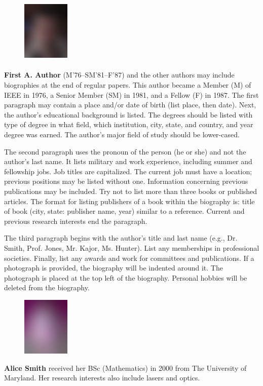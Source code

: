 \documentclass[9pt,twocolumn,twoside]{osajnl}
\begin{document}
\setlength\intextsep{0pt}

\begin{figure}
\includegraphics[width=0.20\textwidth]{johnsmith}
\end{figure}
\paragraph{}
\noindent \textbf{First A. Author} (M’76–SM’81–F’87) and the other authors may include biographies at the end of regular papers. This author became a Member (M) of IEEE in 1976, a Senior Member (SM) in 1981, and a Fellow (F) in 1987. The first paragraph may contain a place and/or date of birth (list place, then date). Next, the author’s educational background is listed. The degrees should be listed with type of degree in what field, which institution, city, state, and country, and year degree was earned. The author’s major field of study should be lower-cased.
  
The second paragraph uses the pronoun of the person (he or she) and not the author’s last name. It lists military and work experience, including summer and fellowship jobs. Job titles are capitalized. The current job must have a location; previous positions may be listed without one. Information concerning previous publications may be included. Try not to list more than three books or published articles. The format for listing publishers of a book within the biography is: title of book (city, state: publisher name, year) similar to a reference. Current and previous research interests end the paragraph.

The third paragraph begins with the author’s title and last name (e.g., Dr. Smith, Prof. Jones, Mr. Kajor, Ms. Hunter). List any memberships in professional societies. Finally, list any awards and work for committees and publications.  If a photograph is provided, the biography will be indented around it. The photograph is placed at the top left of the biography. Personal hobbies will be deleted from the biography.\\

  \begin{figure}
     \includegraphics[width=0.2\textwidth]{alicesmith}
   \end{figure}
   \noindent
   \textbf{Alice Smith} received her BSc (Mathematics) in 2000 from The University of Maryland. Her research interests also include lasers and optics.\\
  
\end{document}

